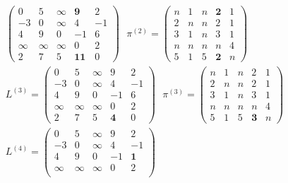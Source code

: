 \documentclass[11pt,a4paper]{article}
\begin{document}
\begin{loesung}
\begin{enumerate}
\begin{align*}
\begin{pmatrix}
                0 & 5 & \infty & \mathbf{9} & 2 \\
                -3 & 0 & \infty & 4 & -1 \\
                4 & 9 & 0 & -1 & 6 \\
                \infty & \infty & \infty & 0 & 2 \\
                2 & 7 & 5 & \mathbf{11} & 0
            \end{pmatrix}
            \,\,\,\,
            \pi^{(2)} =
            \begin{pmatrix}
                n & 1 & n & \mathbf{2} & 1 \\
                2 & n & n & 2 & 1 \\
                3 & 1 & n & 3 & 1 \\
                n & n & n & n & 4 \\
                5 & 1 & 5 & \mathbf{2} & n
            \end{pmatrix}
            \\
            L^{(3)} =
            \begin{pmatrix}
                0 & 5 & \infty & 9 & 2 \\
                -3 & 0 & \infty & 4 & -1 \\
                4 & 9 & 0 & -1 & 6 \\
                \infty & \infty & \infty & 0 & 2 \\
                2 & 7 & 5 & \mathbf{4} & 0
            \end{pmatrix}
            \,\,\,\,
            \pi^{(3)} =
            \begin{pmatrix}
                n & 1 & n & 2 & 1 \\
                2 & n & n & 2 & 1 \\
                3 & 1 & n & 3 & 1 \\
                n & n & n & n & 4 \\
                5 & 1 & 5 & \mathbf{3} & n
            \end{pmatrix}
            \\
            L^{(4)} =
            \begin{pmatrix}
                0 & 5 & \infty & 9 & 2 \\
                -3 & 0 & \infty & 4 & -1 \\
                4 & 9 & 0 & -1 & \mathbf{1} \\
                \infty & \infty & \infty & 0 & 2 \\

\end{pmatrix}
\end{align*}
\end{enumerate}
\end{loesung}
\end{document}
